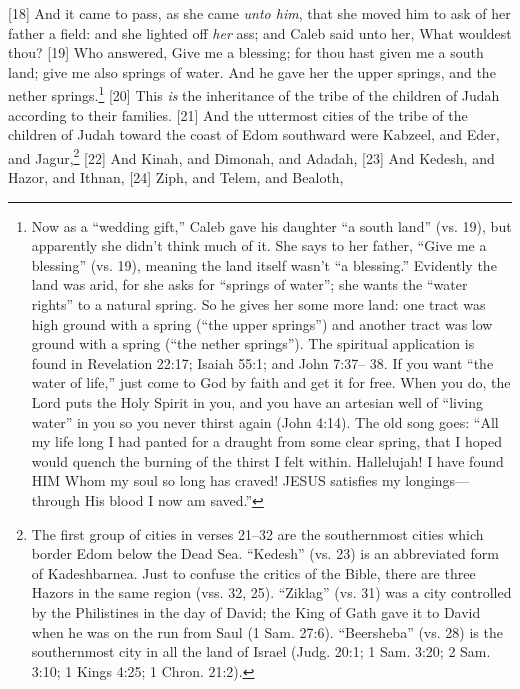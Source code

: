 [18] \textcolor[rgb]{0.00,0.00,1.00}{And it came to pass, as she came \emph{unto him}, that she moved him to ask of her father a field: and she lighted off \emph{her} ass; and Caleb said unto her, What wouldest thou?}
[19] \textcolor[rgb]{0.00,0.00,1.00}{Who answered, Give me a blessing; for thou hast given me a south land; give me also springs of water. And he gave her the upper springs, and the nether springs.}\footnote{Now as a “wedding gift,” Caleb gave his
daughter “a south land” (vs. 19), but
apparently she didn’t think much of it. She says
to her father, “Give me a blessing” (vs. 19),
meaning the land itself wasn’t “a blessing.”
Evidently the land was arid, for she asks for
“springs of water”; she wants the “water
rights” to a natural spring. So he gives her some
more land: one tract was high ground with a
spring (“the upper springs”) and another tract
was low ground with a spring (“the nether
springs”).
The spiritual application is found in
Revelation 22:17; Isaiah 55:1; and John 7:37–
38. If you want “the water of life,” just come
to God by faith and get it for free. When you
do, the Lord puts the Holy Spirit in you, and
you have an artesian well of “living water” in
you so you never thirst again (John 4:14). The
old song goes: “All my life long I had panted
for a draught from some clear spring, that I
hoped would quench the burning of the thirst I
felt within. Hallelujah! I have found HIM
Whom my soul so long has craved! JESUS
satisfies my longings—through His blood I now
am saved.”}
[20] \textcolor[rgb]{0.00,0.00,1.00}{This \emph{is} the inheritance of the tribe of the children of Judah according to their families.}
[21] \textcolor[rgb]{0.00,0.00,1.00}{And the uttermost cities of the tribe of the children of Judah toward the coast of Edom southward were Kabzeel, and Eder, and Jagur,}\footnote{The first group of cities in verses 21–32 are
the southernmost cities which border Edom
below the Dead Sea. “Kedesh” (vs. 23) is an
abbreviated form of Kadeshbarnea. Just to
confuse the critics of the Bible, there are three
Hazors in the same region (vss. 32, 25).
“Ziklag” (vs. 31) was a city controlled by the
Philistines in the day of David; the King of
Gath gave it to David when he was on the run
from Saul (1 Sam. 27:6). “Beersheba” (vs. 28)
is the southernmost city in all the land of Israel
(Judg. 20:1; 1 Sam. 3:20; 2 Sam. 3:10; 1 Kings
4:25; 1 Chron. 21:2).}
[22] \textcolor[rgb]{0.00,0.00,1.00}{And Kinah, and Dimonah, and Adadah,}
[23] \textcolor[rgb]{0.00,0.00,1.00}{And Kedesh, and Hazor, and Ithnan,}
[24] \textcolor[rgb]{0.00,0.00,1.00}{Ziph, and Telem, and Bealoth,}
